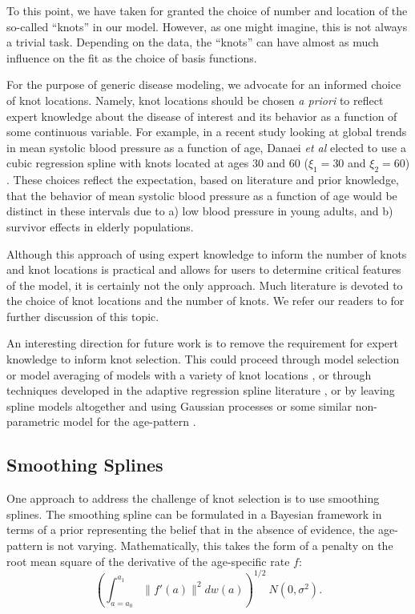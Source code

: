 To this point, we have taken for granted the choice of number and
location of the so-called ``knots'' in our model. However, as one
might imagine, this is not always a trivial task. Depending on the
data, the ``knots'' can have almost as much influence on the fit as
the choice of basis functions.

For the purpose of generic disease modeling, we advocate for an
informed choice of knot locations. Namely, knot locations should be
chosen \emph{a priori} to reflect expert knowledge about the disease
of interest and its behavior as a function of some continuous
variable. For example, in a recent study looking at global trends in
mean systolic blood pressure as a function of age, Danaei \emph{et al}
elected to use a cubic regression spline with knots located at ages 30
and 60 ($\xi_1 = 30$ and $\xi_2=60$) \cite{Danaei_National_2011}. These
choices reflect the expectation, based on literature and prior
knowledge, that the behavior of mean systolic blood pressure as a
function of age would be distinct in these intervals due to a) low
blood pressure in young adults, and b) survivor effects in elderly
populations.

Although this approach of using expert knowledge to inform the number
of knots and knot locations is practical and allows for users to
determine critical features of the model, it is certainly not the only
approach. Much literature is devoted to the choice of knot locations
and the number of knots. We refer our readers to \cite{ESL,
  Wand2001[KP2]} for further discussion of this topic.

An interesting direction for future work is to remove the requirement
for expert knowledge to inform knot selection.  This could proceed
through model selection or model averaging of models with a variety of
knot locations \cite{[ref baysian model averaging[KP3]]}, or through
techniques developed in the adaptive regression spline literature
\cite{[ref[KP4]]}, or by leaving spline models altogether and using Gaussian
processes or some similar non-parametric model for the age-pattern
\cite{[ref GP[KP5]]}.

\subsection{Smoothing Splines}
One approach to address the challenge of knot selection is to use
smoothing splines.  The smoothing spline can be formulated in a
Bayesian framework in terms of a prior representing the belief that in
the absence of evidence, the age-pattern is not varying.
Mathematically, this takes the form of a penalty on the root mean
square of the derivative of the age-specific rate $f$:
\[
\left(\int _{a=a_0} ^{a_1} \| f'(a) \|^2 dw(a)\right)^{1/2} ~ N(0, \sigma^2).
\]

